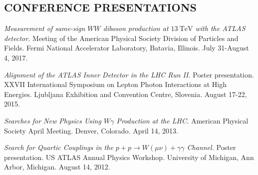 \documentclass[10pt]{res}
\begin{document}
\begin{resume}
    \section{CONFERENCE PRESENTATIONS}
    {\it Measurement of same-sign $WW$ diboson production at $13~\textrm{TeV}$ with the ATLAS detector.} Meeting of the American Physical Society Division of Particles and Fields.  Fermi National Accelerator Laboratory, Batavia, Illinois. July 31-August 4, 2017.

    {\it Alignment of the ATLAS Inner Detector in the LHC Run II.} Poster presentation.  XXVII International Symposium on Lepton Photon Interactions at High Energies. Ljubljana Exhibition and Convention Centre, Slovenia.  August 17-22, 2015.

    {\it Searches for New Physics Using $W\gamma$ Production at the LHC.} American Physical Society April Meeting. Denver, Colorado. April 14, 2013.

    {\it Search for Quartic Couplings in the $p+p\rightarrow W(\mu\nu)+\gamma\gamma$ Channel.} Poster presentation. US ATLAS Annual Physics Workshop. University of Michigan, Ann Arbor, Michigan.  August 14, 2012.
%   


\end{resume}
\end{document}
